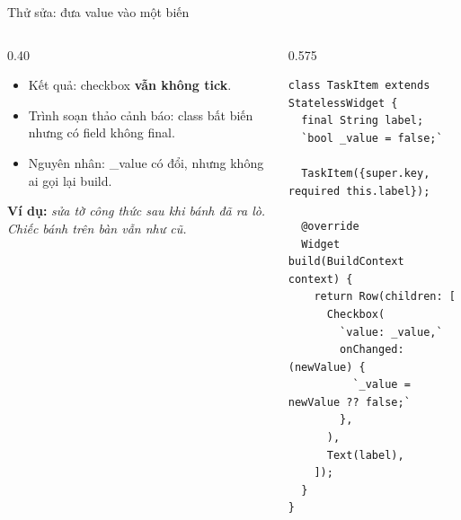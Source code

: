 \documentclass[aspectratio=169,11pt]{beamer}
\newcommand{\ma}[1]{{\ttfamily\small #1}}
\newcommand{\vidu}[1]{%
  \par\vspace{2.5mm}%
  {\raggedright\small\color{xam}\textbf{Ví dụ:} \itshape #1\par}}
\begin{document}
\begin{frame}[fragile]{Thử sửa: đưa value vào một biến}
  \begin{columns}[T,onlytextwidth]
    \begin{column}{0.40\textwidth}
      \begin{itemize}
        \item Kết quả: checkbox \textbf{vẫn không tick}.
        \item Trình soạn thảo cảnh báo: class bất biến nhưng có field không \ma{final}.
        \item Nguyên nhân: \ma{\_value} có đổi, nhưng không ai gọi lại \ma{build}.
      \end{itemize}
      \vidu{sửa tờ công thức sau khi bánh đã ra lò. Chiếc bánh trên bàn vẫn như cũ.}
    \end{column}
    \begin{column}{0.575\textwidth}
\begin{lstlisting}
class TaskItem extends StatelessWidget {
  final String label;
  `bool _value = false;`

  TaskItem({super.key, required this.label});

  @override
  Widget build(BuildContext context) {
    return Row(children: [
      Checkbox(
        `value: _value,`
        onChanged: (newValue) {
          `_value = newValue ?? false;`
        },
      ),
      Text(label),
    ]);
  }
}
\end{lstlisting}
    \end{column}
  \end{columns}
\end{frame}
\end{document}
